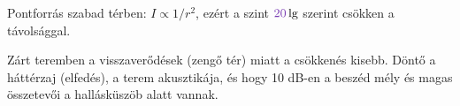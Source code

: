 Pontforrás szabad térben: $I\propto1/r^2$, ezért a szint ${\cc{20}}\lg$ szerint csökken a távolsággal.

\begin{center}\end{center}

\begin{center}\end{center}

Zárt teremben a visszaverődések (zengő tér) miatt a csökkenés kisebb. Döntő a háttérzaj (elfedés), a terem akusztikája, és hogy 10 dB-en a beszéd mély és magas összetevői a hallásküszöb alatt vannak.
\begin{eredmeny}

\begin{center}\end{center}
\end{eredmeny}


